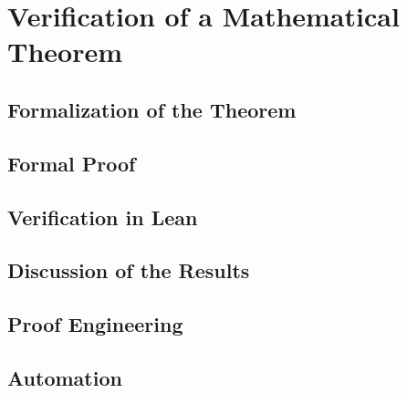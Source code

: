 

\chapter{Verification of a Mathematical Theorem}
\label{c:chapter7}


\section{Formalization of the Theorem}

\section{Formal Proof}

\section{Verification in Lean}

\section{Discussion of the Results}

\section{Proof Engineering}

\section{Automation}